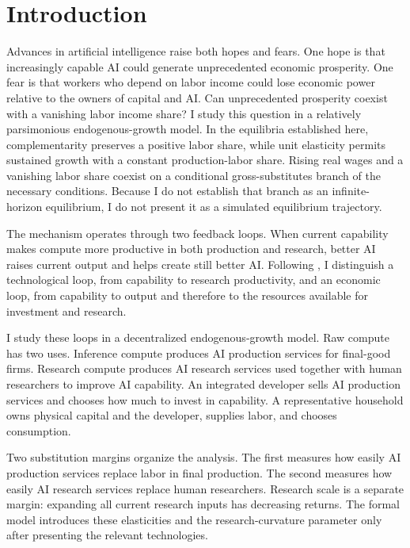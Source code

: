 \section{Introduction}

Advances in artificial intelligence raise both hopes and fears. One hope is
that increasingly capable AI could generate unprecedented economic prosperity.
One fear is that workers who depend on labor income could lose economic power
relative to the owners of capital and AI. Can unprecedented prosperity coexist
with a vanishing labor income share? I study this question in a relatively
parsimonious endogenous-growth model. In the equilibria established here,
complementarity preserves a positive labor share, while unit elasticity permits
sustained growth with a constant production-labor share. Rising real wages and
a vanishing labor share coexist on a conditional gross-substitutes branch of
the necessary conditions. Because I do not establish that branch as an
infinite-horizon equilibrium, I do not present it as a simulated equilibrium
trajectory.

The mechanism operates through two feedback loops. When current capability
makes compute more productive in both production and research, better AI raises
current output and helps create still better AI. Following
\citet{davidsonetal2026}, I distinguish a technological loop, from capability to
research productivity, and an economic loop, from capability to output and
therefore to the resources available for investment and research.

I study these loops in a decentralized endogenous-growth model. Raw compute has
two uses. Inference compute produces AI production services for final-good firms.
Research compute produces AI research services used together with human
researchers to improve AI capability. An integrated developer sells AI production services and
chooses how much to invest in capability. A representative household owns
physical capital and the developer, supplies labor, and chooses consumption.

Two substitution margins organize the analysis. The first measures how easily
AI production services replace labor in final production. The second measures how easily
AI research services replace human researchers. Research scale is a
separate margin: expanding all current research inputs has decreasing returns.
The formal model introduces these elasticities and the research-curvature
parameter only after presenting the relevant technologies.

